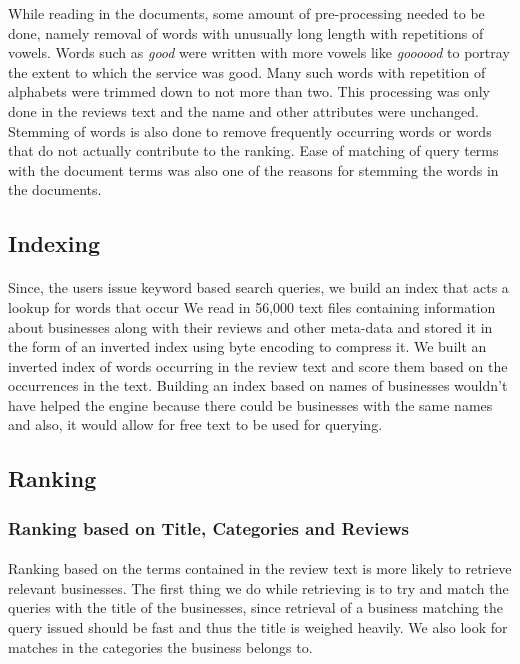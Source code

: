 \documentclass[paper=letter, fontsize=15pt]{article} %
\begin{document}
While reading in the documents, some amount of pre-processing needed to be done, namely removal of words with unusually long length with repetitions of vowels. Words such as \textit{good} were written with more vowels like \textit{goooood} to portray the extent to which the service was good. Many such words with repetition of alphabets were trimmed down to not more than two. This processing was only done in the reviews text and the name and other attributes were unchanged. Stemming of words is also done to remove frequently occurring words or words that do not actually contribute to the ranking. Ease of matching of query terms with the document terms was also one of the reasons for stemming the words in the documents.


\subsection{Indexing}
\paragraph{}Since, the users issue keyword based search queries, we build an index that acts a lookup for words that occur  We read in 56,000 text files containing information about businesses along with their reviews and other meta-data and stored it in the form of an inverted index using byte encoding to compress it. We built an inverted index of words occurring in the review text and score them based on the occurrences in the text. Building an index based on names of businesses wouldn't have helped the engine because there could be businesses with the same names and also, it would allow for free text to be used for querying.

\subsection{Ranking}
\subsubsection{Ranking based on Title, Categories and Reviews}
\paragraph{}Ranking based on the terms contained in the review text is more likely to retrieve relevant businesses. The first thing we do while retrieving is to try and match the queries with the title of the businesses, since retrieval of a business matching the query issued should be fast and thus the title is weighed heavily. We also look for matches in the categories the business belongs to. 
\end{document}
